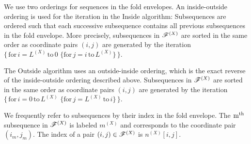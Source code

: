 \documentclass[10pt]{article}
\begin{document}
We use two orderings for sequences in the fold envelopes.  An inside-outside ordering is used for the iteration 
in the Inside algorithm: Subsequences are ordered such that each successive subsequence 
contains all previous subsequences in the fold envelope.  More precisely, subsequences in $\mathscr{F}^{(X)}$ are sorted  
in the same order as coordinate pairs $(i,j)$ are generated by the
iteration $\{\,\mathrm{for}\, i = L^{(X)} \,\mathrm{to}\, 0 \,\,\{
\mathrm{for}\, j = i \,\mathrm{to}\, L^{(X)} \}\,\}$.

The Outside algorithm uses an outside-inside ordering, which is the exact reverse of the inside-outside ordering described above.
Subsequences in $\mathscr{F}^{(X)}$ are sorted 
in the same order as coordinate pairs $(i,j)$ are generated by the 
iteration $\{\,\mathrm{for}\, i = 0 \,\mathrm{to}\, L^{(X)} \,\,\{ \mathrm{for}\, j = L^{(X)}\, \mathrm{to}\, i \}\,\}$.

We frequently refer to subsequences by their index in the fold envelope.
The $\mathrm{m}^{\mathrm{th}}$ subsequence in $\mathscr{F}^{(X)}$ is labeled $m^{(X)}$ and corresponds to the coordinate pair $(i_{m}, j_{m})$.  The 
index of a pair $(i,j) \in \mathscr{F}^{(X)}$ is $n^{(X)}[i,j]$.
\end{document}
